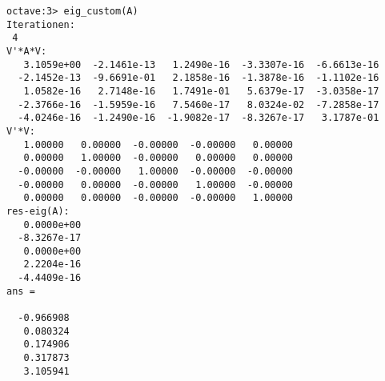\begin{lstlisting}[label=lst:2]
octave:3> eig_custom(A)
Iterationen:
 4
V'*A*V:
   3.1059e+00  -2.1461e-13   1.2490e-16  -3.3307e-16  -6.6613e-16
  -2.1452e-13  -9.6691e-01   2.1858e-16  -1.3878e-16  -1.1102e-16
   1.0582e-16   2.7148e-16   1.7491e-01   5.6379e-17  -3.0358e-17
  -2.3766e-16  -1.5959e-16   7.5460e-17   8.0324e-02  -7.2858e-17
  -4.0246e-16  -1.2490e-16  -1.9082e-17  -8.3267e-17   3.1787e-01
V'*V:
   1.00000   0.00000  -0.00000  -0.00000   0.00000
   0.00000   1.00000  -0.00000   0.00000   0.00000
  -0.00000  -0.00000   1.00000  -0.00000  -0.00000
  -0.00000   0.00000  -0.00000   1.00000  -0.00000
   0.00000   0.00000  -0.00000  -0.00000   1.00000
res-eig(A):
   0.0000e+00
  -8.3267e-17
   0.0000e+00
   2.2204e-16
  -4.4409e-16
ans =

  -0.966908
   0.080324
   0.174906
   0.317873
   3.105941
\end{lstlisting}
